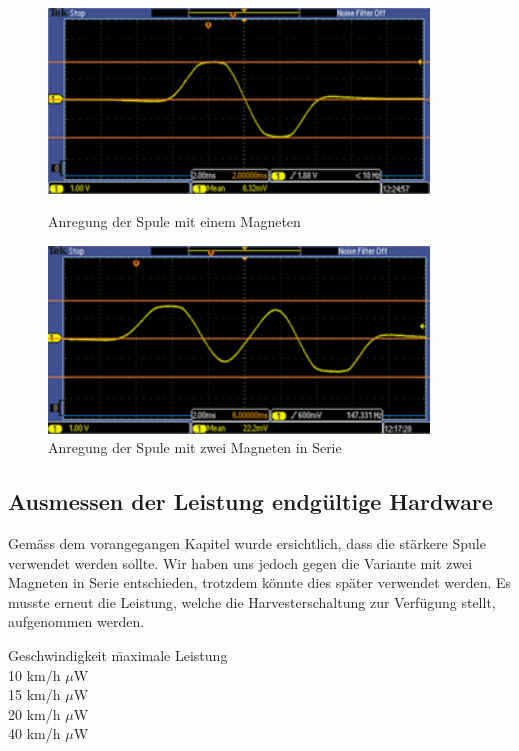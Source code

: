\begin{figure}[ht]
 \begin{minipage}[t]{0.5\textwidth}
  \includegraphics[width=0.9\textwidth]{3Vorgehen/imag/zweiMagneteInSerie_links.png}
  \caption{Anregung der Spule mit einem Magneten}
  \label{zweiMagneteInSerie} 
 \end{minipage}
 \begin{minipage}[t]{0.5\textwidth}
  \includegraphics[width=0.9\textwidth]{3Vorgehen/imag/zweiMagneteInSerie_rechts.png}
  \caption{Anregung der Spule mit zwei Magneten in Serie}
 \end{minipage}
\end{figure}


\subsection{Ausmessen der Leistung endgültige Hardware}

Gemäss dem vorangegangen Kapitel  wurde ersichtlich, dass die stärkere Spule verwendet werden sollte. Wir haben uns jedoch gegen die Variante mit zwei Magneten in Serie entschieden, trotzdem könnte dies später verwendet werden. Es musste erneut die Leistung, welche die Harvesterschaltung zur Verfügung stellt, aufgenommen werden.

\begin{minipage}{\textwidth}
\begin{tabbing}
    Geschwindigkeit   	\quad\= maximale Leistung    \\[0.8ex]
    10 km/h		         $\mu$W\\
	15 km/h		         $\mu$W\\
	20 km/h		         $\mu$W\\
	40 km/h		         $\mu$W\\
\end{tabbing}
\end{minipage}

